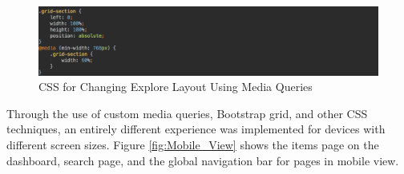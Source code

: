\begin{figure}[H]
	\centering
	\includegraphics[width=1.0\textwidth]{images/Code/Grid_CSS}
	\caption{CSS for Changing Explore Layout Using Media Queries} \label{fig:Grid_CSS}
\end{figure}

Through the use of custom media queries, Bootstrap grid, and other CSS techniques, an entirely different experience was implemented for devices with different screen sizes. Figure \ref{fig:Mobile_View} shows the items page on the dashboard, search page, and the global navigation bar for pages in mobile view.

